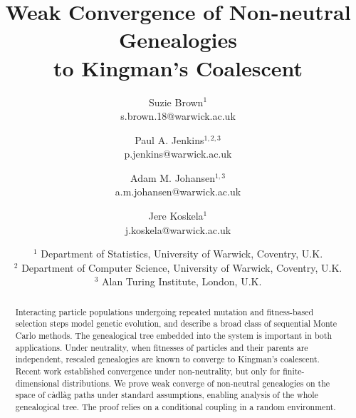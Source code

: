 \documentclass[12pt,authoryear]{article}
\theoremstyle{definition}
\newcommand{\1}[1]{\mathbbm{1}_{#1}}
\begin{document}

\title{Weak Convergence of Non-neutral Genealogies\\ to Kingman's Coalescent}

\author{Suzie Brown$^{1}$\\s.brown.18@warwick.ac.uk \and Paul A. Jenkins$^{1,2,3}$\\p.jenkins@warwick.ac.uk \and Adam M. Johansen$^{1,3}$\\a.m.johansen@warwick.ac.uk \and Jere Koskela$^{1}$\\j.koskela@warwick.ac.uk} 
{\date{\small $^1$ Department of Statistics, University of Warwick, Coventry, U.K.\\[2pt]
$^2$ Department of Computer Science, University of Warwick, Coventry, U.K.\\[2pt]
$^3$ Alan Turing Institute, London, U.K.}}
      
\maketitle

\begin{abstract}

Interacting particle populations undergoing repeated mutation and fitness-based selection steps model genetic evolution, and describe a broad class of sequential Monte Carlo methods. 
The genealogical tree embedded into the system is important in both applications. 
Under neutrality, when fitnesses of particles and their parents are independent, rescaled genealogies are known to converge to Kingman's coalescent. 
Recent work established convergence under non-neutrality, but only for finite-dimensional distributions. 
We prove weak converge of non-neutral genealogies on the space of c\`adl\`ag paths under standard assumptions, enabling analysis of the whole genealogical tree. 
The proof relies on a conditional coupling in a random environment.

\end{abstract}
\end{document}
